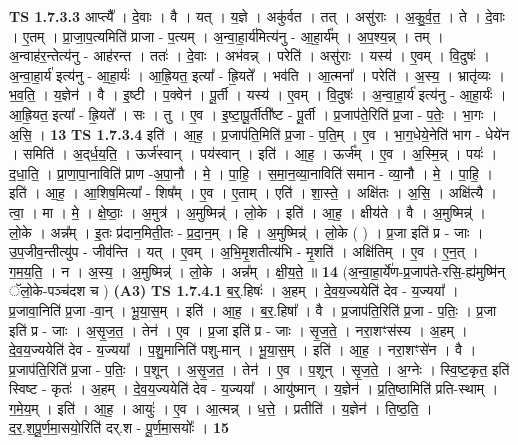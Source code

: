 \documentclass[17pt]{extarticle}
\begin{document}
                  \newline
                                \textbf{ TS 1.7.3.3} \newline
                  आप्त्यै᳚ । दे॒वाः । वै । यत् । य॒ज्ञे । अकु॑र्वत । तत् । असु॑राः । अ॒कु॒र्व॒त॒ । ते । दे॒वाः । ए॒तम् । प्रा॒जा॒प॒त्यमिति॑ प्राजा - प॒त्यम् । अ॒न्वा॒हा॒र्य॑मित्य॑नु - आ॒हा॒र्य᳚म् । अ॒प॒श्य॒न्न् । तम् । अ॒न्वाह॑र॒न्तेत्य॑नु - आह॑रन्त । ततः॑ । दे॒वाः । अभ॑वन्न् । परेति॑ । असु॑राः । यस्य॑ । ए॒वम् । वि॒दुषः॑ । अ॒न्वा॒हा॒र्य॑ इत्य॑नु - आ॒हा॒र्यः॑ । आ॒ह्रि॒यत॒ इत्या᳚ - ह्रि॒यते᳚ । भव॑ति । आ॒त्मना᳚ । परेति॑ । अ॒स्य॒ । भ्रातृ॑व्यः । भ॒व॒ति॒ । य॒ज्ञेन॑ । वै । इ॒ष्टी । प॒क्वेन॑ । पू॒र्ती । यस्य॑ । ए॒वम् । वि॒दुषः॑ । अ॒न्वा॒हा॒र्य॑ इत्य॑नु - आ॒हा॒र्यः॑ । आ॒ह्रि॒यत॒ इत्या᳚ - ह्रि॒यते᳚ । सः । तु । ए॒व । इ॒ष्टा॒पू॒र्तीती᳚ष्ट - पू॒र्ती । प्र॒जाप॑ते॒रिति॑ प्र॒जा - प॒तेः॒ । भा॒गः । अ॒सि॒ । \textbf{  13} \newline
                  \newline
                                \textbf{ TS 1.7.3.4} \newline
                  इति॑ । आ॒ह॒ । प्र॒जाप॑ति॒मिति॑ प्र॒जा - प॒ति॒म् । ए॒व । भा॒ग॒धेये॒नेति॑ भाग - धेये॑न । समिति॑ । अ॒द्‌र्ध॒य॒ति॒ । ऊर्ज॑स्वान् । पय॑स्वान् । इति॑ । आ॒ह॒ । ऊर्ज᳚म् । ए॒व । अ॒स्मि॒न्न् । पयः॑ । द॒धा॒ति॒ । प्रा॒णा॒पा॒नाविति॑ प्राण -अ॒पा॒नौ । मे॒ । पा॒हि॒ । स॒मा॒न॒व्या॒नाविति॑ समान - व्या॒नौ । मे॒ । पा॒हि॒ । इति॑ । आ॒ह॒ । आ॒शिष॒मित्या᳚ - शिष᳚म् । ए॒व । ए॒ताम् । एति॑ । शा॒स्ते॒ । अक्षि॑तः । अ॒सि॒ । अक्षि॑त्यै । त्वा॒ । मा । मे॒ । क्षे॒ष्ठाः॒ । अ॒मुत्र॑ । अ॒मुष्मिन्न्॑ । लो॒के । इति॑ । आ॒ह॒ । क्षीय॑ते । वै । अ॒मुष्मिन्न्॑ । लो॒के । अन्न᳚म् । इ॒तः प्र॑दान॒मिती॒तः - प्र॒दा॒न॒म् । हि । अ॒मुष्मिन्न्॑ । लो॒के ( ) । प्र॒जा इति॑ प्र - जाः । उ॒प॒जीव॒न्तीत्यु॑प - जीव॑न्ति । यत् । ए॒वम् । अ॒भि॒मृ॒शतीत्य॑भि - मृ॒शति॑ । अक्षि॑तिम् । ए॒व । ए॒न॒त् । ग॒म॒य॒ति॒ । न । अ॒स्य॒ । अ॒मुष्मिन्न्॑ । लो॒के । अन्न᳚म् । क्षी॒य॒ते॒ ॥ \textbf{  14} \newline
                  \newline
                      (अ॒न्वा॒हा॒र्ये॑ण-प्र॒जाप॑ते-रसि॒-ह्य॑मुष्मि॑न् ॅलो॒के-पञ्च॑दश च )  \textbf{(A3)} \newline \newline
                                \textbf{ TS 1.7.4.1} \newline
                  ब॒र्॒.हिषः॑ । अ॒हम् । दे॒व॒य॒ज्ययेति॑ देव - य॒ज्यया᳚ । प्र॒जावा॒निति॑ प्र॒जा -वा॒न् । भू॒या॒स॒म् । इति॑ । आ॒ह॒ । ब॒र॒.हिषा᳚ । वै । प्र॒जाप॑ति॒रिति॑ प्र॒जा - प॒तिः॒ । प्र॒जा इति॑ प्र - जाः । अ॒सृ॒ज॒त॒ । तेन॑ । ए॒व । प्र॒जा इति॑ प्र - जाः । सृ॒ज॒ते॒ । नरा॒शꣳस॑स्य । अ॒हम् । दे॒व॒य॒ज्ययेति॑ देव - य॒ज्यया᳚ । प॒शु॒मानिति॑ पशु-मान् । भू॒या॒स॒म् । इति॑ । आ॒ह॒ । नरा॒शꣳसे॑न । वै । प्र॒जाप॑ति॒रिति॑ प्र॒जा - प॒तिः॒ । प॒शून् । अ॒सृ॒ज॒त॒ । तेन॑ । ए॒व । प॒शून् । सृ॒ज॒ते॒ । अ॒ग्नेः । स्वि॒ष्ट॒कृत॒ इति॑ स्विष्ट - कृतः॑ । अ॒हम् । दे॒व॒य॒ज्ययेति॑ देव - य॒ज्यया᳚ । आयु॑ष्मान् । य॒ज्ञेन॑ । प्र॒ति॒ष्ठामिति॑ प्रति-स्थाम् । ग॒मे॒य॒म् । इति॑ । आ॒ह॒ । आयुः॑ । ए॒व । आ॒त्मन्न् । ध॒त्ते॒ । प्रतीति॑ । य॒ज्ञेन॑ । ति॒ष्ठ॒ति॒ । द॒र॒.श॒पू॒र्ण॒मा॒सयो॒रिति॑ दर्.श - पू॒र्ण॒मा॒सयोः᳚ । \textbf{  15} \newline
\end{document}
